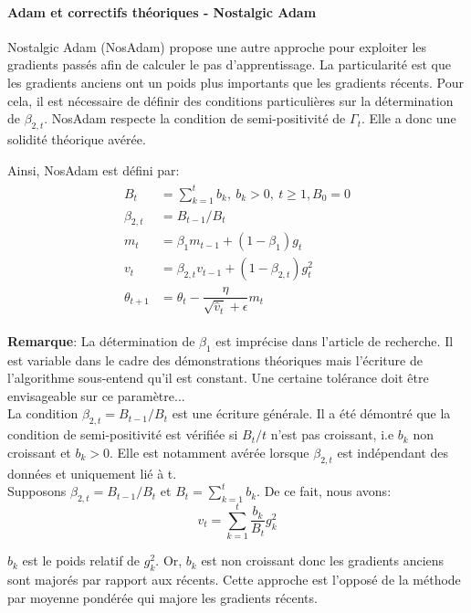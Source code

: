 \paragraph{Adam et correctifs théoriques - Nostalgic Adam}

Nostalgic Adam\cite{nosadam} (NosAdam) propose une autre approche pour exploiter les gradients passés afin de calculer le pas d'apprentissage. La particularité est que les gradients anciens ont un poids plus importants que les gradients récents. Pour cela, il est nécessaire de définir des conditions particulières sur la détermination de $\beta_{2,t}$. NosAdam respecte la condition de semi-positivité de $\Gamma_t$. Elle a donc une solidité théorique avérée.

\noindent Ainsi, NosAdam est défini par:
\begin{align*}
\begin{split}
B_t&=\sum_{k=1}^t b_k, \ b_k >0, \ t \geq 1,  B_0=0\\
\beta_{2,t} &=B_{t-1}/B_t\\
m_t &= \beta_{1} m_{t-1} + (1 - \beta_{1}) g_t \\
v_t &= \beta_{2,t} v_{t-1} + (1 - \beta_{2,t}) g_t^2\\
\theta_{t+1} &= \theta_{t} - \dfrac{\eta}{\sqrt{\hat{v}_t} + \epsilon} m_t
\end{split}
\end{align*}

\noindent \textbf{Remarque}: La détermination de $\beta_1$ est imprécise dans l'article de recherche. Il est variable dans le cadre des démonstrations théoriques mais l'écriture de l'algorithme sous-entend qu'il est constant. Une certaine tolérance doit être envisageable sur ce paramètre...\\

\noindent La condition $\beta_{2,t}=B_{t-1}/B_t$ est une écriture générale. Il a été démontré que la condition de semi-positivité est vérifiée si $B_t/t$ n'est pas croissant, i.e $b_k$ non croissant et $b_k>0$. Elle est notamment avérée lorsque $\beta_{2,t}$ est indépendant des données et uniquement lié à t. \\

\noindent Supposons $\beta_{2,t} =B_{t-1}/B_t$ et $B_t=\sum_{k=1}^t b_k$. De ce fait, nous avons:
$$v_t=\sum_{k=1}^t \frac{b_k}{B_t}g_k^2$$

\noindent $b_k$ est le poids relatif de $g_k^2$. Or, $b_k$ est non croissant donc les gradients anciens sont majorés par rapport aux récents. Cette approche est l'opposé de la méthode par moyenne pondérée qui majore les gradients récents.\\

